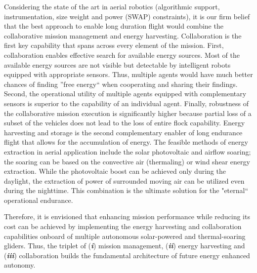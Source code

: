 \documentclass{ifacconf}
\begin{document}
Considering the state of the art in aerial robotics (algorithmic support, instrumentation, size weight and power (SWAP) constraints), it is our firm belief that the best approach to enable long duration flight would combine the collaborative mission management and energy harvesting. Collaboration is the first key capability that spans across every element of the mission. First, collaboration enables effective search for available energy sources. Most of the available energy sources are not visible but detectable by intelligent robots equipped with appropriate sensors. Thus, multiple agents would have much better chances of finding ''free energy`` when cooperating and sharing their findings. Second, the operational utility of multiple agents equipped with complementary sensors is superior to the capability of an individual agent. Finally, robustness of the collaborative mission execution is significantly higher because partial loss of a subset of the vehicles does not lead to the loss of entire flock capability. Energy harvesting and storage is the second complementary enabler of long endurance flight that allows for the accumulation of energy. The feasible methods of energy extraction in aerial application include the solar photovoltaic and airflow soaring; the soaring can be based on the convective air (thermaling) or wind shear energy extraction. While the photovoltaic boost can be achieved only during the daylight, the extraction of power of surrounded moving air can be utilized even during the nighttime. This combination is the ultimate solution for the "eternal`` operational endurance.

Therefore, it is envisioned that enhancing mission performance while reducing its cost can be achieved by implementing the energy harvesting and collaboration capabilities onboard of multiple autonomous solar-powered and thermal-soaring gliders. Thus, the triplet of (\emph{\textbf{i}}) mission management, (\emph{\textbf{ii}}) energy harvesting and (\emph{\textbf{iii}}) collaboration builds the fundamental architecture of future energy enhanced autonomy.
\end{document}

